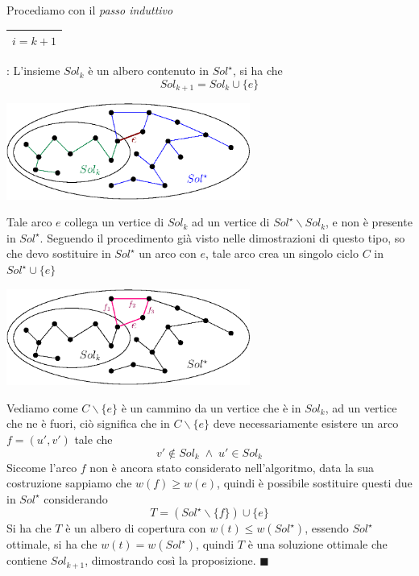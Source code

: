 \documentclass[12pt, letterpaper]{article}
\newcommand{\boxedMath}[1]{\begin{tabular}{|c|}\hline \texttt{#1} \\ \hline\end{tabular} :}
\begin{document}
Procediamo con il \textit{passo induttivo} \boxedMath{$i=k+1$} L'insieme $Sol_k$ è un albero contenuto in $Sol^\star$, si
ha che $$ Sol_{k+1}=Sol_k\cup\{e\}$$
\begin{center}
    \includegraphics[width=0.6\textwidth ]{images/dimPrim1.eps}
\end{center}
Tale arco $e$ collega un vertice di $Sol_k$ ad un vertice di $Sol^\star\backslash Sol_k$, e non è presente in $Sol^\star$.
Seguendo il procedimento già visto nelle dimostrazioni di questo tipo, so che devo sostituire in $Sol^\star$ un arco
con $e$, tale arco crea un singolo ciclo $C$ in $Sol^\star \cup \{e\}$
\begin{center}
    \includegraphics[width=0.6\textwidth ]{images/dimPrim2.eps}
\end{center}
Vediamo come $C\backslash\{e\}$ è un cammino da un vertice che è in $Sol_k$, ad un vertice che ne è fuori, ciò significa
che in $C\backslash\{e\}$ deve necessariamente esistere un arco $f=(u',v')$ tale che $$v'\notin Sol_k\;\land\;u'\in Sol_k$$
Siccome l'arco $f$ non è ancora stato considerato nell'algoritmo, data la sua costruzione sappiamo che $w(f)\ge w(e)$, quindi
è possibile sostituire questi due in $Sol^\star$ considerando
$$ T=(Sol^\star\backslash\{f\})\cup\{e\}$$
Si ha che $T$ è un albero di copertura con $w(t)\le w(Sol^\star)$, essendo $Sol^\star$ ottimale, si ha che
$w(t) = w(Sol^\star)$, quindi $T$ è una soluzione ottimale che contiene $Sol_{k+1}$, dimostrando così la proposizione. $\blacksquare$
\newpage
\end{document}
